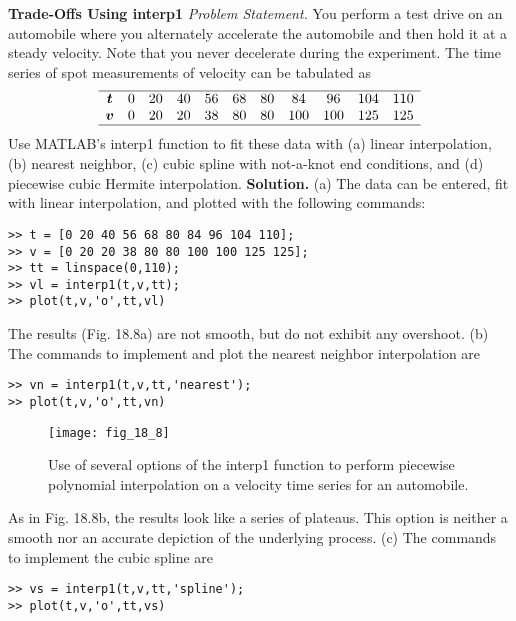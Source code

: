\documentclass[../main.tex]{subfiles}
\begin{document}
\begin{exmp} \textbf{Trade-Offs Using interp1}
    \noindent\textit{Problem Statement.} You perform a test drive on an automobile where you alternately
    accelerate the automobile and then hold it at a steady velocity. Note that you never decelerate during the experiment. The time series of spot measurements of velocity can be
    tabulated as
$$
    \begin{array}{ccccccccccc}
        \hline \boldsymbol{t} & 0 & 20 & 40 & 56 & 68 & 80 & 84 & 96 & 104 & 110 \\
        \boldsymbol{v} & 0 & 20 & 20 & 38 & 80 & 80 & 100 & 100 & 125 & 125 \\
        \hline
        \end{array}
$$
Use MATLAB's interp1 function to fit these data with (a) linear interpolation, (b) nearest neighbor, (c) cubic spline with not-a-knot end conditions, and (d) piecewise cubic
Hermite interpolation.
    \noindent \textbf{Solution.} (a) The data can be entered, fit with linear interpolation, and plotted with the
    following commands:

    \begin{lstlisting}[numbers=none]
>> t = [0 20 40 56 68 80 84 96 104 110];
>> v = [0 20 20 38 80 80 100 100 125 125];
>> tt = linspace(0,110);
>> vl = interp1(t,v,tt);
>> plot(t,v,'o',tt,vl)
    \end{lstlisting}
    The results (Fig. 18.8a) are not smooth, but do not exhibit any overshoot.
    (b) The commands to implement and plot the nearest neighbor interpolation are
    \begin{lstlisting}[numbers=none]
>> vn = interp1(t,v,tt,'nearest');
>> plot(t,v,'o',tt,vn)
    \end{lstlisting}

    \begin{figure}[H]
        \centering
        \texttt{[image: fig\_18\_8]}
       \caption{\textsf{Use of several options of the interp1 function to perform piecewise polynomial interpolation on a velocity time series
       for an automobile.}}\label{fig:fig_18_8}
    \end{figure}

    As in Fig. 18.8b, the results look like a series of plateaus. This option is neither a smooth
nor an accurate depiction of the underlying process.
(c) The commands to implement the cubic spline are

\begin{lstlisting}[numbers=none]
>> vs = interp1(t,v,tt,'spline');
>> plot(t,v,'o',tt,vs)
\end{lstlisting}


\end{exmp}
\end{document}
